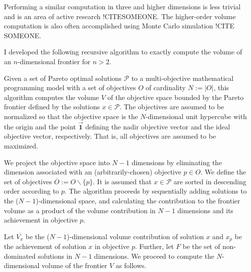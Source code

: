 Performing a similar computation in three and higher dimensions is less trivial and is an area of active research !CITESOMEONE. The higher-order volume computation is also often accomplished using Monte Carlo simulation !CITE SOMEONE.

I developed the following recursive algorithm to exactly compute the volume of an $n$-dimensional frontier for $n>2$.

Given a set of Pareto optimal solutions $\mathcal{P}$ to a multi-objective mathematical programming model with a set of objectives $O$ of cardinality $N := |O|$, this algorithm computes the volume $V$ of the objective space bounded by the Pareto frontier defined by the solutions $x \in \mathcal{P}$. The objectives are assumed to be normalized so that the objective space is the $N$-dimensional unit hypercube with the origin and the point $\vec{\mathbf{1}}$ defining the nadir objective vector and the ideal objective vector, respectively. That is, all objectives are assumed to be maximized.

We project the objective space into $N-1$ dimensions by eliminating the dimension associated with an (arbitrarily-chosen) objective $p \in O$. We define the set of objectives $\overbar{O} := O \backslash \{p\}$. It is assumed that $x \in \mathcal{P}$ are sorted in descending order according to $p$. The algorithm proceeds by sequentially adding solutions to the ($N-1$)-dimensional space, and calculating the contribution to the frontier volume as a product of the volume contribution in $N-1$ dimensions and its achievement in objective $p$.

Let
$\overbar{V_x}$ be the ($N-1$)-dimensional volume contribution of solution $x$ and
$x_p$ be the achievement of solution $x$ in objective $p$. Further, let
$F$ be the set of non-dominated solutions in $N-1$ dimensions.
We proceed to compute the $N$-dimensional volume of the frontier $V$ as follows.

